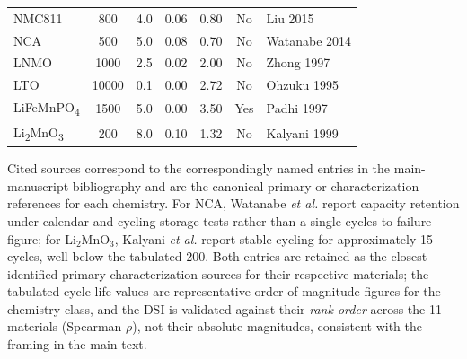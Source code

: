 \documentclass[10pt]{article}
\begin{document}
\begin{table}[htbp]
\begin{tabular}{l c c c c c l}
NMC811                      & 800    & 4.0  & 0.06 & 0.80 & No  & Liu 2015 \\
NCA                         & 500    & 5.0  & 0.08 & 0.70 & No  & Watanabe 2014 \\
LNMO                        & 1000   & 2.5  & 0.02 & 2.00 & No  & Zhong 1997 \\
LTO                         & 10000  & 0.1  & 0.00 & 2.72 & No  & Ohzuku 1995 \\
LiFeMnPO\textsubscript{4}   & 1500   & 5.0  & 0.00 & 3.50 & Yes & Padhi 1997 \\
Li\textsubscript{2}MnO\textsubscript{3} & 200 & 8.0 & 0.10 & 1.32 & No & Kalyani 1999 \\
\hline
\end{tabular}

\vspace{0.5em}
\noindent\footnotesize
Cited sources correspond to the correspondingly named entries in the
main-manuscript bibliography and are the canonical primary or
characterization references for each chemistry. For NCA, Watanabe
\textit{et al.} report capacity retention under calendar and cycling
storage tests rather than a single cycles-to-failure figure; for
Li$_2$MnO$_3$, Kalyani \textit{et al.} report stable cycling for
approximately 15 cycles, well below the tabulated 200. Both entries are
retained as the closest identified primary characterization sources for
their respective materials; the tabulated cycle-life values are
representative order-of-magnitude figures for the chemistry class, and
the DSI is validated against their \emph{rank order} across the 11
materials (Spearman $\rho$), not their absolute magnitudes, consistent
with the framing in the main text.
\normalsize
\end{table}

\vspace{1em}
\end{document}
